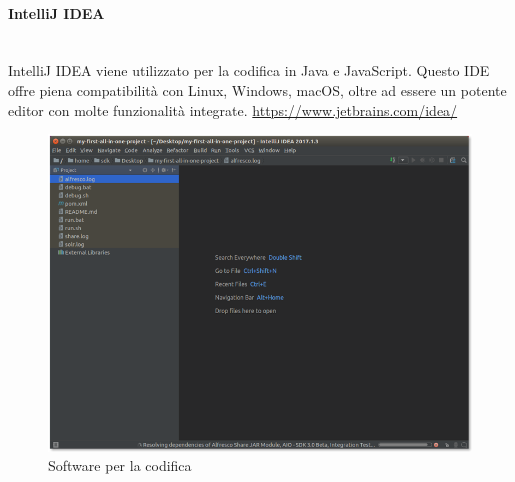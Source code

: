 \paragraph{IntelliJ IDEA} \mbox{}\\
IntelliJ IDEA viene utilizzato per la codifica in Java e JavaScript. Questo IDE offre piena compatibilità con Linux, Windows, macOS, oltre ad essere un potente editor con molte funzionalità integrate.
\url{https://www.jetbrains.com/idea/}
\begin{figure}[H]
	\includegraphics[width=0.99\linewidth]{res/images/intellij.png}
	\caption{Software per la codifica}
\end{figure} 